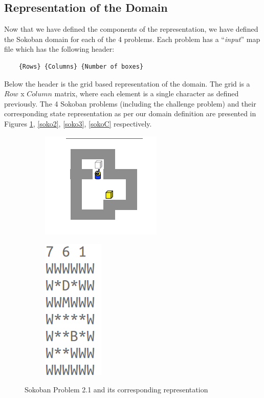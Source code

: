 \documentclass[10pt, letter]{article}
\begin{document}
\subsection*{Representation of the Domain}
Now that we have defined the components of the representation, we have defined the Sokoban domain for each of the 4 problems. Each problem has a ``\textit{input}'' map file which has the following header:
\begin{verbatim}
	{Rows} {Columns} {Number of boxes}
\end{verbatim}
Below the header is the grid based representation of the domain. The grid is a $Row$ x $Column$ matrix, where each element is a single character as defined previously. The 4 Sokoban problems (including the challenge problem) and their corresponding state representation as per our domain definition are presented in Figures \ref{soko1}, \ref{soko2}, \ref{soko3}, \ref{sokoC} respectively.

\begin{figure} [h!]
\centering
\begin{subfigure}{.5\textwidth}
  \centering
  \includegraphics[scale = 0.5]{images/sokoban1}
\end{subfigure}%
\begin{subfigure}{.5\textwidth}
  \centering
  \includegraphics[scale = 0.5]{images/sokoban1-plan}
\end{subfigure}%
\caption{Sokoban Problem 2.1 and its corresponding representation}
\label{soko1}
\end{figure}
\end{document}
